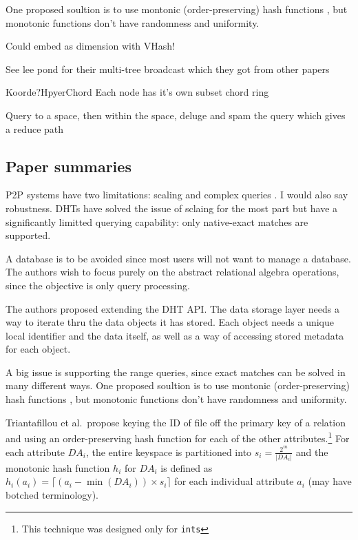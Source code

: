 One proposed soultion is to use montonic (order-preserving) hash functions \cite{triantafillou2004towards}, but monotonic functions don't have randomness and uniformity.


Could embed as dimension with VHash!


See lee pond for their multi-tree broadcast which they got from other papers \cite{lee2012pond}



Koorde?HpyerChord
Each node has it's own subset chord ring

Query to a space, then within the space, deluge and spam the query which gives a reduce path
\subsection{Paper summaries}

P2P systems have two limitations: scaling and complex queries \cite{harren2002complex}.  
I would also say robustness.
DHTs have solved the issue of sclaing for the most part but have a significantly limitted querying capability:  only native-exact matches are supported.  

A database is to be avoided since most users will not want to manage a database.  
The authors wish to focus purely on the abstract relational algebra operations, since the objective is only query processing.

The authors proposed extending the DHT API.
The data storage layer needs a way to iterate thru the data objects it has stored.
Each object needs a unique local identifier and the data itself, as well as a way of accessing stored metadata for each object. 


A big issue is supporting the range queries, since exact matches can be solved in many different ways.
One proposed soultion is to use montonic (order-preserving) hash functions \cite{triantafillou2004towards}, but monotonic functions don't have randomness and uniformity.

Triantafillou et al.\ propose keying the ID of file off the primary key of a relation and using an order-preserving hash function for each of the other attributes.\footnote{This technique was designed only for \texttt{ints}}
For each attribute $DA_i$, the entire keyspace is partitioned into $s_i = \frac{2^{m}}{|DA_{i}|}$ and the monotonic hash function $h_i$ for $DA_i$ is defined as  $h_{i}(a_{i})=\lceil (a_{i} - \min(DA_i)) \times s_i \rceil$ for each individual attribute $a_i$  (may have botched terminology).


